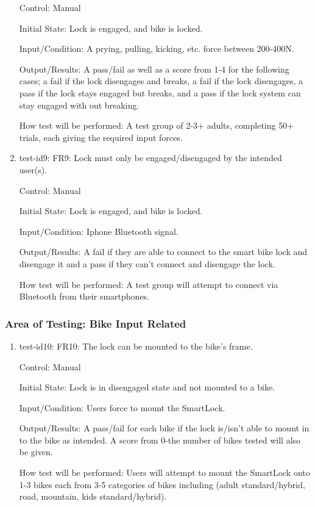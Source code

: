 \documentclass[12pt, titlepage]{article}
\begin{document}
\begin{enumerate}
Control: Manual

Initial State: Lock is engaged, and bike is locked.

Input/Condition: A prying, pulling, kicking, etc. force between 200-400N.

Output/Results: A pass/fail as well as a score from 1-4 for the following cases; a fail if the lock disengages and breaks, a fail if the lock disengages, a pass if the lock stays engaged but breaks, and a pass if the lock system can stay engaged with out breaking.

How test will be performed: A test group of 2-3+ adults, completing 50+ trials, each giving the required input forces.

\item{test-id9: FR9: Lock must only be engaged/disengaged by the intended user(s). \\}

Control: Manual

Initial State: Lock is engaged, and bike is locked.

Input/Condition: Iphone Bluetooth signal.

Output/Results: A fail if they are able to connect to the smart bike lock and disengage it and a pass if they can’t connect and disengage the lock.

How test will be performed: A test group will attempt to connect via Bluetooth from their smartphones.

\end{enumerate}

\subsubsection{Area of Testing: Bike Input Related}

\begin{enumerate}

\item{test-id10: FR10: The lock can be mounted to the bike’s frame. \\}

Control: Manual

Initial State: Lock is in disengaged state and not mounted to a bike.

Input/Condition: Users force to mount the SmartLock.

Output/Results: A pass/fail for each bike if the lock is/isn’t able to mount in to the bike as intended. A score from 0-the number of bikes tested will also be given.

How test will be performed: Users will attempt to mount the SmartLock onto 1-3 bikes each from 3-5 categories of bikes including (adult standard/hybrid, road, mountain, kids standard/hybrid).

\end{enumerate}
\end{document}
